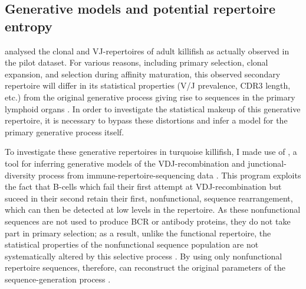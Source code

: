 \subsection{Generative models and potential repertoire entropy}
\label{sec:igseq_pilot_generative}

 analysed the clonal and VJ-repertoires of adult killifish as actually observed in the pilot dataset. For various reasons, including primary selection, clonal expansion, and selection during affinity maturation, this observed secondary repertoire will differ in its statistical properties (V/J prevalence, CDR3 length, etc.) from the original generative process giving rise to \igh{} sequences in the primary lymphoid organs \parencite{elhanati2015model}. In order to investigate the statistical makeup of this generative repertoire, it is necessary to bypass these distortions and infer a model for the primary generative process itself.

To investigate these generative repertoires in turquoise killifish, I made use of , a tool for inferring generative models of the VDJ-recombination and junctional-diversity process from immune-repertoire-sequencing data \parencite{marcou2018igor}. This program exploits the fact that B-cells which fail their first attempt at VDJ-recombination but suceed in their second retain their first, nonfunctional, sequence rearrangement, which can then be detected at low levels in the repertoire. As these nonfunctional sequences are not used to produce BCR or antibody proteins, they do not take part in primary selection; as a result, unlike the functional repertoire, the statistical properties of the nonfunctional sequence population are not systematically altered by this selective process \parencite{elhanati2015model}. By using only nonfunctional repertoire sequences, therefore,  can reconstruct the original parameters of the sequence-generation process \parencite{marcou2018igor}.

